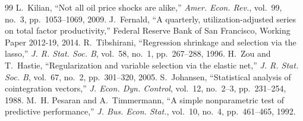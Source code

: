 \documentclass[conference]{IEEEtran}
\begin{document}
\begin{thebibliography}{99}
 L.~Kilian, ``Not all oil price shocks are alike,'' \emph{Amer. Econ. Rev.}, vol.~99, no.~3, pp.~1053--1069, 2009.
 J.~Fernald, ``A quarterly, utilization-adjusted series on total factor productivity,'' Federal Reserve Bank of San Francisco, Working Paper 2012-19, 2014.
 R.~Tibshirani, ``Regression shrinkage and selection via the lasso,'' \emph{J. R. Stat. Soc. B}, vol.~58, no.~1, pp.~267--288, 1996.
 H.~Zou and T.~Hastie, ``Regularization and variable selection via the elastic net,'' \emph{J. R. Stat. Soc. B}, vol.~67, no.~2, pp.~301--320, 2005.
 S.~Johansen, ``Statistical analysis of cointegration vectors,'' \emph{J. Econ. Dyn. Control}, vol.~12, no.~2--3, pp.~231--254, 1988.
 M.~H. Pesaran and A.~Timmermann, ``A simple nonparametric test of predictive performance,'' \emph{J. Bus. Econ. Stat.}, vol.~10, no.~4, pp.~461--465, 1992.
\end{thebibliography}
\end{document}
